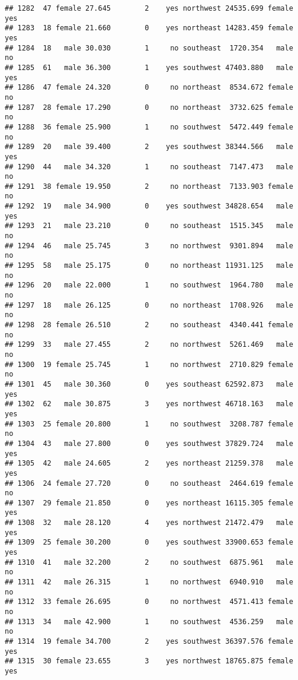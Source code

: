 \documentclass[
]{article}
\begin{document}
\begin{verbatim}
## 1282  47 female 27.645        2    yes northwest 24535.699 female      yes
## 1283  18 female 21.660        0    yes northeast 14283.459 female      yes
## 1284  18   male 30.030        1     no southeast  1720.354   male       no
## 1285  61   male 36.300        1    yes southwest 47403.880   male      yes
## 1286  47 female 24.320        0     no northeast  8534.672 female       no
## 1287  28 female 17.290        0     no northeast  3732.625 female       no
## 1288  36 female 25.900        1     no southwest  5472.449 female       no
## 1289  20   male 39.400        2    yes southwest 38344.566   male      yes
## 1290  44   male 34.320        1     no southeast  7147.473   male       no
## 1291  38 female 19.950        2     no northeast  7133.903 female       no
## 1292  19   male 34.900        0    yes southwest 34828.654   male      yes
## 1293  21   male 23.210        0     no southeast  1515.345   male       no
## 1294  46   male 25.745        3     no northwest  9301.894   male       no
## 1295  58   male 25.175        0     no northeast 11931.125   male       no
## 1296  20   male 22.000        1     no southwest  1964.780   male       no
## 1297  18   male 26.125        0     no northeast  1708.926   male       no
## 1298  28 female 26.510        2     no southeast  4340.441 female       no
## 1299  33   male 27.455        2     no northwest  5261.469   male       no
## 1300  19 female 25.745        1     no northwest  2710.829 female       no
## 1301  45   male 30.360        0    yes southeast 62592.873   male      yes
## 1302  62   male 30.875        3    yes northwest 46718.163   male      yes
## 1303  25 female 20.800        1     no southwest  3208.787 female       no
## 1304  43   male 27.800        0    yes southwest 37829.724   male      yes
## 1305  42   male 24.605        2    yes northeast 21259.378   male      yes
## 1306  24 female 27.720        0     no southeast  2464.619 female       no
## 1307  29 female 21.850        0    yes northeast 16115.305 female      yes
## 1308  32   male 28.120        4    yes northwest 21472.479   male      yes
## 1309  25 female 30.200        0    yes southwest 33900.653 female      yes
## 1310  41   male 32.200        2     no southwest  6875.961   male       no
## 1311  42   male 26.315        1     no northwest  6940.910   male       no
## 1312  33 female 26.695        0     no northwest  4571.413 female       no
## 1313  34   male 42.900        1     no southwest  4536.259   male       no
## 1314  19 female 34.700        2    yes southwest 36397.576 female      yes
## 1315  30 female 23.655        3    yes northwest 18765.875 female      yes

\end{verbatim}
\end{document}

